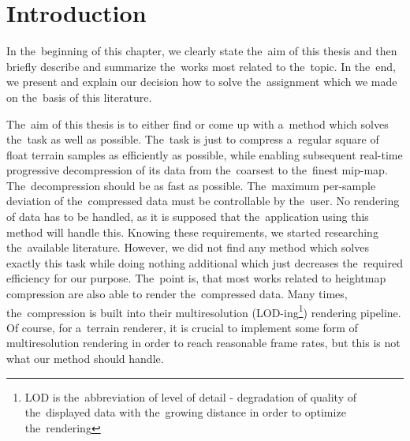 \chapter{Introduction}\label{chap:introduction}

In the~beginning of this chapter, we clearly state the~aim of this thesis and then briefly describe and summarize the~works most related to the~topic. In the~end, we present and explain our decision how to solve the~assignment which we made on the~basis of this literature.

The~aim of this thesis is to either find or come up with a~method which solves the~task as well as possible. The~task is just to compress a~regular square of float terrain samples as efficiently as possible, while enabling subsequent real-time progressive decompression of its data from the~coarsest to the~finest mip-map. The~decompression should be as fast as possible. The~maximum per-sample deviation of the~compressed data must be controllable by the~user. No rendering of data has to be handled, as it is supposed that the~application using this method will handle this. Knowing these requirements, we started researching the~available literature. However, we did not find any method which solves exactly this task while doing nothing additional which just decreases the~required efficiency for our purpose. The~point is, that most works related to heightmap compression are also able to render the~compressed data. Many times, the~compression is built into their multiresolution (LOD-ing\footnote{LOD is the~abbreviation of level of detail - degradation of quality of the~displayed data with the~growing distance in order to optimize the~rendering}) rendering pipeline. Of course, for a~terrain renderer, it is crucial to implement some form of multiresolution rendering in order to reach reasonable frame rates, but this is not what our method should handle. 


